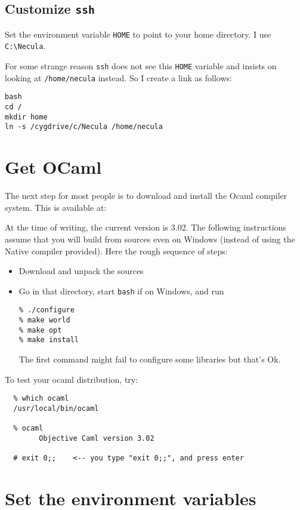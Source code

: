 \documentclass{article}
\def\t#1{{\tt #1}}
\begin{document}
 \subsection{Customize \t{ssh}}\label{sec-win-ssh}

 Set the environment variable \t{HOME} to point to your home directory. I use
 \t{C:\backslash Necula}. 

 For some strange reason \t{ssh} does not see this \t{HOME} variable and
insists on looking at \t{/home/necula} instead. So I create a link as follows:
\begin{verbatim}
bash
cd /
mkdir home
ln -s /cygdrive/c/Necula /home/necula
\end{verbatim}


\section{Get OCaml}\label{sec-ocaml}

The next step for most people is to download and install the Ocaml
compiler system.  This is available at:


At the time of writing, the current version is 3.02. The following
instructions assume that you will build from sources even on Windows (instead
of using the Native compiler provided). Here the rough sequence of steps:
\begin{itemize}
\item Download and unpack the sources
\item Go in that directory, start \t{bash} if on Windows, and run
\begin{verbatim}
% ./configure
% make world
% make opt
% make install
\end{verbatim}

 The first command might fail to configure some libraries but that's Ok. 
\end{itemize}

To test your ocaml distribution, try:

\begin{verbatim}
  % which ocaml
  /usr/local/bin/ocaml

  % ocaml
        Objective Caml version 3.02

  # exit 0;;    <-- you type "exit 0;;", and press enter
\end{verbatim}


\section{Set the environment variables}
\end{document}
